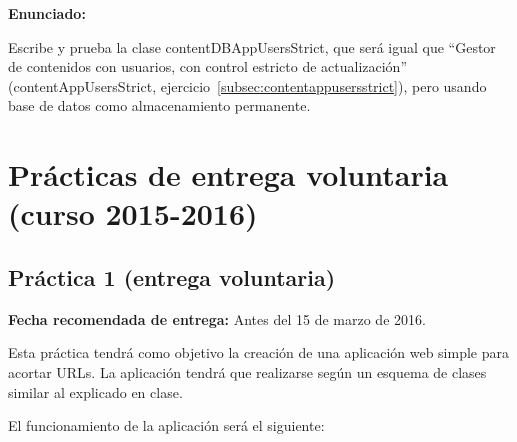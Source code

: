 \textbf{Enunciado:}

Escribe y prueba la clase contentDBAppUsersStrict, que será igual que ``Gestor de contenidos con usuarios, con control estricto de actualización'' (contentAppUsersStrict, ejercicio~\ref{subsec:contentappusersstrict}), pero usando base de datos como almacenamiento permanente.

\newpage

\section{Prácticas de entrega voluntaria (curso 2015-2016)}


\subsection{Práctica 1 (entrega voluntaria)}
\label{subsec:practica-vol-1-2016}

\textbf{Fecha recomendada de entrega:} Antes del 15 de marzo de 2016.

Esta práctica tendrá como objetivo la creación de una aplicación web simple para acortar URLs. La aplicación tendrá que realizarse según un esquema de clases similar al explicado en clase.

El funcionamiento de la aplicación será el siguiente:

